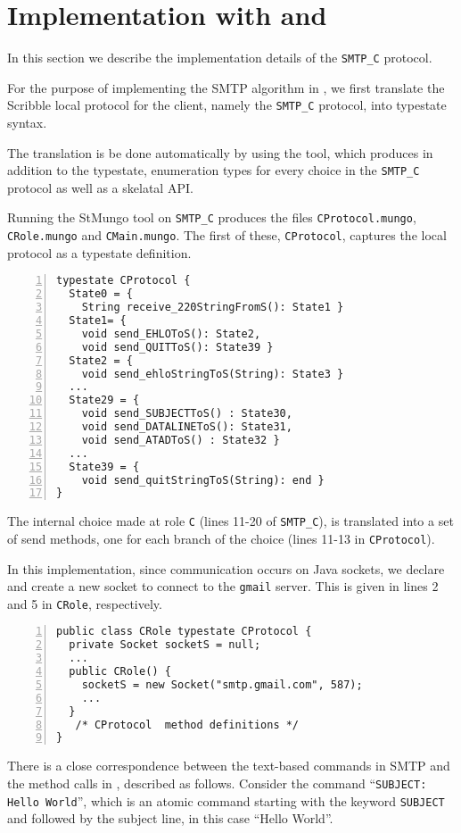 \section{Implementation with \StMungo and \Mungo}
\label{sec: smtp_implementation}
In this section we describe the implementation
details of the \lstinline|SMTP_C| protocol.

%
For the purpose of implementing the SMTP
algorithm in \Mungo,
we first translate the Scribble local protocol for the client, namely the \lstinline|SMTP_C| protocol, into \Mungo typestate syntax.

The translation is be done automatically by using the \StMungo tool,
which produces in addition to the typestate,
enumeration types for every choice in the \lstinline|SMTP_C| protocol as well as a skelatal API.

Running the StMungo tool on \lstinline|SMTP_C| produces the files
\lstinline|CProtocol.mungo|,
\lstinline|CRole.mungo| and \lstinline|CMain.mungo|. The first of these, \lstinline|CProtocol|, captures the local protocol as a typestate definition.
\begin{lstlisting}[numbers=left]
typestate CProtocol {
  State0 = {
    String receive_220StringFromS(): State1 }
  State1= {
    void send_EHLOToS(): State2,
    void send_QUITToS(): State39 }
  State2 = {
    void send_ehloStringToS(String): State3 }
  ...
  State29 = {
    void send_SUBJECTToS() : State30,
    void send_DATALINEToS(): State31,
    void send_ATADToS() : State32 }
  ...
  State39 = {
    void send_quitStringToS(String): end }
}
\end{lstlisting}
The internal choice made at role \lstinline|C| (lines 11-20 of
\lstinline|SMTP_C|), is translated into a set of send methods,
one for each branch of the choice (lines 11-13 in
\lstinline|CProtocol|).


In this implementation, since communication occurs on Java sockets,
we declare and create a new socket to connect to the \lstinline|gmail| server.
This is given in lines 2 and 5 in \lstinline|CRole|, respectively.
\begin{lstlisting}[numbers=left]
public class CRole typestate CProtocol {
  private Socket socketS = null;
  ...
  public CRole() {
    socketS = new Socket("smtp.gmail.com", 587);
    ...
  }
   /* CProtocol  method definitions */
}
\end{lstlisting}

There is a close correspondence between the text-based commands in SMTP
and the method calls in \Mungo, described as follows.
Consider the command
``\lstinline|SUBJECT: Hello World|'', which is an atomic command
starting with the keyword \lstinline|SUBJECT| and followed by the
subject line, in this case ``Hello World''.

